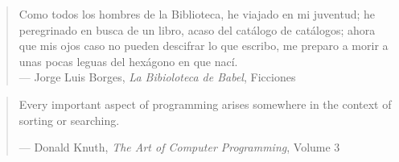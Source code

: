 \newpage
\thispagestyle{empty}
\vspace*{5cm}
\hfill
\begin{minipage}{0.70\textwidth}
\begin{quote}
Como todos los hombres de la Biblioteca, he viajado en mi juventud; he peregrinado en busca de un libro, acaso del catálogo de catálogos; ahora que mis ojos caso no pueden descifrar lo que escribo, me preparo a morir a unas pocas leguas del hexágono en que nací.\\
--- Jorge Luis Borges, \textit{La Bibioloteca de Babel}, Ficciones
\end{quote}
\hspace*{2cm}

\begin{quote}
Every important aspect of programming arises somewhere in the context of sorting or searching.

--- Donald Knuth, \textit{The Art of Computer Programming}, Volume 3
\end{quote}
\end{minipage}

\thispagestyle{empty}
\maketitle


